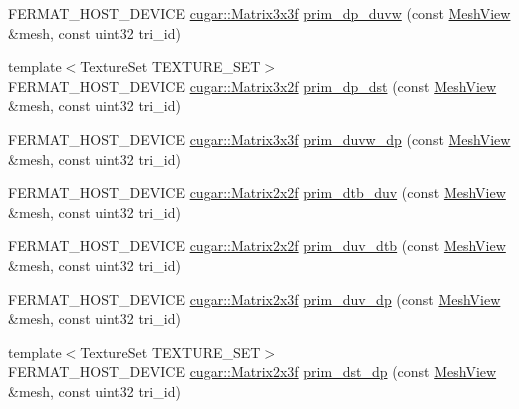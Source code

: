 \begin{DoxyCompactItemize}
\item 
F\+E\+R\+M\+A\+T\+\_\+\+H\+O\+S\+T\+\_\+\+D\+E\+V\+I\+CE \hyperlink{structcugar_1_1_matrix}{cugar\+::\+Matrix3x3f} \hyperlink{group___mesh_module_ga614c297649ecb916e613cc928ccd5f76}{prim\+\_\+dp\+\_\+duvw} (const \hyperlink{struct_mesh_view}{Mesh\+View} \&mesh, const uint32 tri\+\_\+id)
\item 
{\footnotesize template$<$Texture\+Set T\+E\+X\+T\+U\+R\+E\+\_\+\+S\+ET$>$ }\\F\+E\+R\+M\+A\+T\+\_\+\+H\+O\+S\+T\+\_\+\+D\+E\+V\+I\+CE \hyperlink{structcugar_1_1_matrix}{cugar\+::\+Matrix3x2f} \hyperlink{group___mesh_module_ga5b45fde0da8e24af3485a8e733d91cfb}{prim\+\_\+dp\+\_\+dst} (const \hyperlink{struct_mesh_view}{Mesh\+View} \&mesh, const uint32 tri\+\_\+id)
\item 
F\+E\+R\+M\+A\+T\+\_\+\+H\+O\+S\+T\+\_\+\+D\+E\+V\+I\+CE \hyperlink{structcugar_1_1_matrix}{cugar\+::\+Matrix3x3f} \hyperlink{group___mesh_module_gabeca667804111edec7ffce34196f3668}{prim\+\_\+duvw\+\_\+dp} (const \hyperlink{struct_mesh_view}{Mesh\+View} \&mesh, const uint32 tri\+\_\+id)
\item 
F\+E\+R\+M\+A\+T\+\_\+\+H\+O\+S\+T\+\_\+\+D\+E\+V\+I\+CE \hyperlink{structcugar_1_1_matrix}{cugar\+::\+Matrix2x2f} \hyperlink{group___mesh_module_gae21ff4032c22a8cd5309479b4ce155b3}{prim\+\_\+dtb\+\_\+duv} (const \hyperlink{struct_mesh_view}{Mesh\+View} \&mesh, const uint32 tri\+\_\+id)
\item 
F\+E\+R\+M\+A\+T\+\_\+\+H\+O\+S\+T\+\_\+\+D\+E\+V\+I\+CE \hyperlink{structcugar_1_1_matrix}{cugar\+::\+Matrix2x2f} \hyperlink{group___mesh_module_gaa2d04b7a4f0a9b63a1783feae4dae840}{prim\+\_\+duv\+\_\+dtb} (const \hyperlink{struct_mesh_view}{Mesh\+View} \&mesh, const uint32 tri\+\_\+id)
\item 
F\+E\+R\+M\+A\+T\+\_\+\+H\+O\+S\+T\+\_\+\+D\+E\+V\+I\+CE \hyperlink{structcugar_1_1_matrix}{cugar\+::\+Matrix2x3f} \hyperlink{group___mesh_module_gaeb63648183e2a7d1d2e037540414c838}{prim\+\_\+duv\+\_\+dp} (const \hyperlink{struct_mesh_view}{Mesh\+View} \&mesh, const uint32 tri\+\_\+id)
\item 
{\footnotesize template$<$Texture\+Set T\+E\+X\+T\+U\+R\+E\+\_\+\+S\+ET$>$ }\\F\+E\+R\+M\+A\+T\+\_\+\+H\+O\+S\+T\+\_\+\+D\+E\+V\+I\+CE \hyperlink{structcugar_1_1_matrix}{cugar\+::\+Matrix2x3f} \hyperlink{group___mesh_module_ga1976fb01efbfc722e78de1f5415c606e}{prim\+\_\+dst\+\_\+dp} (const \hyperlink{struct_mesh_view}{Mesh\+View} \&mesh, const uint32 tri\+\_\+id)
\item 

\end{DoxyCompactItemize}
